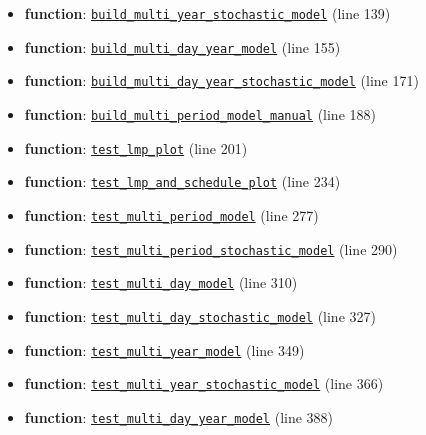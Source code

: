 \documentclass[11pt]{report}
\begin{document}
\begin{itemize}[leftmargin=*]
  \item \textbf{function}: \hyperref[def:multiperiod-tests-test_multiperiod.py:build_multi_year_stochastic_model:L139]{\texttt{build\_multi\_year\_stochastic\_model}} (line 139)
  \item \textbf{function}: \hyperref[def:multiperiod-tests-test_multiperiod.py:build_multi_day_year_model:L155]{\texttt{build\_multi\_day\_year\_model}} (line 155)
  \item \textbf{function}: \hyperref[def:multiperiod-tests-test_multiperiod.py:build_multi_day_year_stochastic_model:L171]{\texttt{build\_multi\_day\_year\_stochastic\_model}} (line 171)
  \item \textbf{function}: \hyperref[def:multiperiod-tests-test_multiperiod.py:build_multi_period_model_manual:L188]{\texttt{build\_multi\_period\_model\_manual}} (line 188)
  \item \textbf{function}: \hyperref[def:multiperiod-tests-test_multiperiod.py:test_lmp_plot:L201]{\texttt{test\_lmp\_plot}} (line 201)
  \item \textbf{function}: \hyperref[def:multiperiod-tests-test_multiperiod.py:test_lmp_and_schedule_plot:L234]{\texttt{test\_lmp\_and\_schedule\_plot}} (line 234)
  \item \textbf{function}: \hyperref[def:multiperiod-tests-test_multiperiod.py:test_multi_period_model:L277]{\texttt{test\_multi\_period\_model}} (line 277)
  \item \textbf{function}: \hyperref[def:multiperiod-tests-test_multiperiod.py:test_multi_period_stochastic_model:L290]{\texttt{test\_multi\_period\_stochastic\_model}} (line 290)
  \item \textbf{function}: \hyperref[def:multiperiod-tests-test_multiperiod.py:test_multi_day_model:L310]{\texttt{test\_multi\_day\_model}} (line 310)
  \item \textbf{function}: \hyperref[def:multiperiod-tests-test_multiperiod.py:test_multi_day_stochastic_model:L327]{\texttt{test\_multi\_day\_stochastic\_model}} (line 327)
  \item \textbf{function}: \hyperref[def:multiperiod-tests-test_multiperiod.py:test_multi_year_model:L349]{\texttt{test\_multi\_year\_model}} (line 349)
  \item \textbf{function}: \hyperref[def:multiperiod-tests-test_multiperiod.py:test_multi_year_stochastic_model:L366]{\texttt{test\_multi\_year\_stochastic\_model}} (line 366)
  \item \textbf{function}: \hyperref[def:multiperiod-tests-test_multiperiod.py:test_multi_day_year_model:L388]{\texttt{test\_multi\_day\_year\_model}} (line 388)

\end{itemize}
\end{document}
